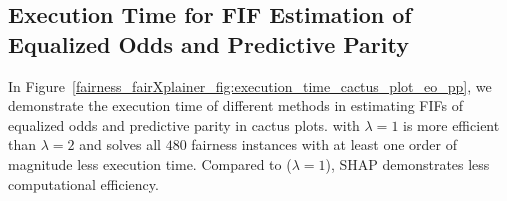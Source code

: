 \subsection{Execution Time for FIF Estimation of Equalized Odds and Predictive Parity}
In Figure~\ref{fairness_fairXplainer_fig:execution_time_cactus_plot_eo_pp}, we demonstrate the execution time of different methods in estimating FIFs of equalized odds and predictive parity in cactus plots. {\fairXplainer} with $ \lambda = 1 $ is more efficient than $ \lambda = 2 $ and solves all $ 480 $ fairness instances with at least one order of magnitude less execution time. Compared to {\fairXplainer} ($ \lambda = 1 $), SHAP demonstrates less computational efficiency.

\begin{figure}
	\centering

\end{figure}
